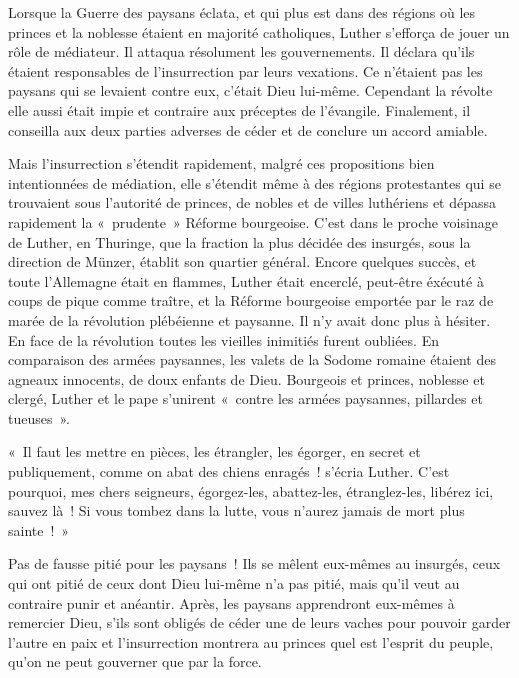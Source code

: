 \documentclass[french,twoside]{book} %
\newenvironment{quoteblock}%
  {\begin{quoting}}
  {\end{quoting}}
\newenvironment{quotebar}{%
    \def\FrameCommand{{\color{rubric!10!}\vrule width 0.5em} \hspace{0.9em}}%
    \def\OuterFrameSep{\itemsep} %
    \MakeFramed {\advance\hsize-\width \FrameRestore}
  }%
  {%
    \endMakeFramed
  }
\renewenvironment{quoteblock}%
  {%
    \savenotes
    \setstretch{0.9}
    \normalfont
    \begin{quotebar}
  }
  {%
    \end{quotebar}
    \spewnotes
  }
\begin{document}
Lorsque la Guerre des paysans éclata, et qui plus est dans des régions où les princes et la noblesse étaient en majorité catholiques, Luther s’efforça de jouer un rôle de médiateur. Il attaqua résolument les gouvernements. Il déclara qu’ils étaient responsables de l’insurrection par leurs vexations. Ce n’étaient pas les paysans qui se levaient contre eux, c’était Dieu lui-même. Cependant la révolte elle aussi était impie et contraire aux préceptes de l’évangile. Finalement, il conseilla aux deux parties adverses de céder et de conclure un accord amiable.\par
Mais l’insurrection s’étendit rapidement, malgré ces propositions bien intentionnées de médiation, elle s’étendit même à des régions protestantes qui se trouvaient sous l’autorité de princes, de nobles et de villes luthériens et dépassa rapidement la « prudente » Réforme bourgeoise. C’est dans le proche voisinage de Luther, en Thuringe, que la fraction la plus décidée des insurgés, sous la direction de Münzer, établit son quartier général. Encore quelques succès, et toute l’Allemagne était en flammes, Luther était encerclé, peut-être éxécuté à coups de pique comme traître, et la Réforme bourgeoise emportée par le raz de marée de la révolution plébéienne et paysanne. Il n’y avait donc plus à hésiter. En face de la révolution toutes les vieilles inimitiés furent oubliées. En comparaison des armées paysannes, les valets de la Sodome romaine étaient des agneaux innocents, de doux enfants de Dieu. Bourgeois et princes, noblesse et clergé, Luther et le pape s’unirent « contre les armées paysannes, pillardes et tueuses ».\par

\begin{quoteblock}
 \noindent « Il faut les mettre en pièces, les étrangler, les égorger, en secret et publiquement, comme on abat des chiens enragés ! s’écria Luther. C’est pourquoi, mes chers seigneurs, égorgez-les, abattez-les, étranglez-les, libérez ici, sauvez là ! Si vous tombez dans la lutte, vous n’aurez jamais de mort plus sainte ! »
\end{quoteblock}

\noindent Pas de fausse pitié pour les paysans ! Ils se mêlent eux-mêmes au insurgés, ceux qui ont pitié de ceux dont Dieu lui-même n’a pas pitié, mais qu’il veut au contraire punir et anéantir. Après, les paysans apprendront eux-mêmes à remercier Dieu, s’ils sont obligés de céder une de leurs vaches pour pouvoir garder l’autre en paix et l’insurrection montrera au princes quel est l’esprit du peuple, qu’on ne peut gouverner que par la force.\par
\end{document}

